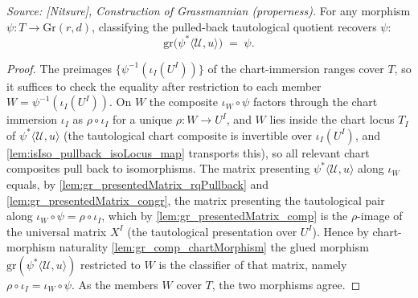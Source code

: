 \begin{lemma}
  \label{lem:gr_grPointOfRankQuotient_rqPullback_tautological}
  \textit{Source: [Nitsure], Construction of Grassmannian (properness).}
  For any morphism \(\psi : T \to \mathrm{Gr}(r,d)\), classifying the pulled-back tautological
  quotient recovers \(\psi\):
  \[
    \mathrm{gr}\bigl(\psi^{*}\langle \mathcal{U}, u\rangle\bigr) \;=\; \psi .
  \]
\end{lemma}
\begin{proof}
    \leanok
  The preimages \(\{\psi^{-1}(\iota_I(U^I))\}\) of the chart-immersion ranges cover \(T\), so
  it suffices to check the equality after restriction to each member \(W = \psi^{-1}
  (\iota_I(U^I))\). On \(W\) the composite \(\iota_W\circ\psi\) factors through the chart
  immersion \(\iota_I\) as \(\rho\circ\iota_I\) for a unique \(\rho : W \to U^I\), and \(W\)
  lies inside the chart locus \(T_I\) of \(\psi^{*}\langle\mathcal{U},u\rangle\) (the
  tautological chart composite is invertible over \(\iota_I(U^I)\), and
  \cref{lem:isIso_pullback_isoLocus_map} transports this), so all relevant chart composites
  pull back to isomorphisms. The matrix presenting \(\psi^{*}\langle\mathcal{U},u\rangle\)
  along \(\iota_W\) equals, by \cref{lem:gr_presentedMatrix_rqPullback} and
  \cref{lem:gr_presentedMatrix_congr}, the matrix presenting the tautological pair along
  \(\iota_W\circ\psi = \rho\circ\iota_I\), which by \cref{lem:gr_presentedMatrix_comp} is the
  \(\rho\)-image of the universal matrix \(X^I\) (the tautological presentation over \(U^I\)).
  Hence by chart-morphism naturality \cref{lem:gr_comp_chartMorphism} the glued morphism
  \(\mathrm{gr}(\psi^{*}\langle\mathcal{U},u\rangle)\) restricted to \(W\) is the classifier of
  that matrix, namely \(\rho\circ\iota_I = \iota_W\circ\psi\). As the members \(W\) cover
  \(T\), the two morphisms agree.
\end{proof}

